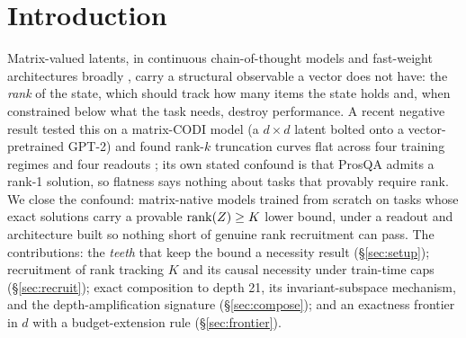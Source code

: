 \section{Introduction}
\label{sec:intro}

Matrix-valued latents, in continuous chain-of-thought models
\citep{hao2024coconut} and fast-weight architectures broadly
\citep{schlag2021linear}, carry a structural observable a vector does
not have: the \emph{rank} of the state, which should track how many
items the state holds and, when constrained below what the task needs,
destroy performance.
A recent negative result tested this on a matrix-CODI model (a
$d \times d$ latent bolted onto a vector-pretrained GPT-2) and found
rank-$k$ truncation curves flat across four training regimes and four
readouts \citep{larson2026gradient}; its own stated confound is that
ProsQA admits a rank-1 solution, so flatness says nothing about tasks
that provably require rank. We close the confound: matrix-native
models trained from scratch on tasks whose exact solutions carry a
provable $\operatorname{rank}(Z) \geq K$ lower bound, under a readout and
architecture built so nothing short of genuine rank recruitment can
pass. The contributions: the \emph{teeth} that keep the
bound a necessity result (\S\ref{sec:setup}); recruitment of rank
tracking $K$ and its causal necessity under train-time caps
(\S\ref{sec:recruit}); exact composition to depth 21, its
invariant-subspace mechanism, and the depth-amplification signature
(\S\ref{sec:compose}); and an exactness
frontier in $d$ with a budget-extension rule (\S\ref{sec:frontier}).

